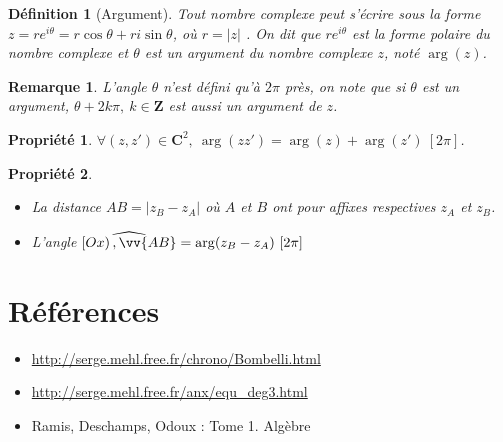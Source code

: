 \documentclass[11pt,a4paper,french]{article}
\newcommand{\Z}{\mathbf{Z}}
\newcommand{\C}{\mathbf{C}}
\newcommand{\abs}[1]{\left\lvert #1 \right\rvert}
\theoremstyle{break}
\newtheorem{definition}{Définition}
\newtheorem{propriete}{Propriété}
\theoremstyle{plain}
\theoremstyle{nonumberplain}
\newtheorem{remarque}{Remarque}
\theoremstyle{nonumberbreak}
\begin{document}
\begin{definition}[Argument]
  Tout nombre complexe peut s'écrire sous la forme $z = re^{i\theta} =
  r\cos \theta + ri\sin \theta$, où $r = \abs{z}$ . On dit que
  $re^{i\theta}$ est la forme polaire du nombre complexe et $\theta$ est
  un \emph{argument} du nombre complexe $z$, noté $\arg(z)$.
\end{definition}

\begin{remarque} L'angle $\theta$ n'est défini qu'à $2\pi$ près, on note
  que si $\theta$ est un argument, $\theta + 2k\pi,\ k\in\Z$ est aussi
  un argument de $z$.
\end{remarque}

\begin{propriete}
  $\forall (z,z') \in \C^2,\ \arg(zz') = \arg(z) + \arg(z') \ [2\pi]$.
\end{propriete}

\begin{propriete}
  \begin{itemize}
    \item La distance $AB = \abs{z_B - z_A}$ où $A$ et $B$ ont pour
      affixes respectives $z_A$ et $z_B$.
    \item L'angle $\widehat{\left[Ox\right),\vv{AB}} = \arg(z_B - z_A)
      \ [2\pi]$
  \end{itemize}
\end{propriete}

\section*{Références}

\begin{itemize}
  \item \url{http://serge.mehl.free.fr/chrono/Bombelli.html}
  \item \url{http://serge.mehl.free.fr/anx/equ_deg3.html}
  \item Ramis, Deschamps, Odoux : Tome 1. Algèbre
\end{itemize}
\end{document}
